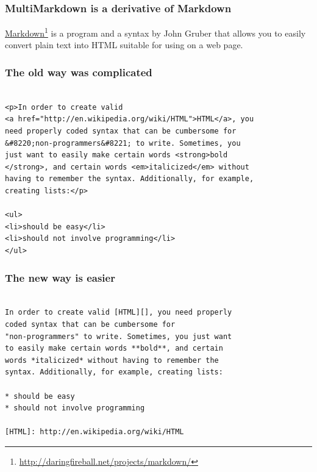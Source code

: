 
\def\mytitle{What is MultiMarkdown?  }
\def\subtitle{And why should you care? }
\def\myauthor{Fletcher T. Penney  }
\def\affiliation{http:\slash \slash fletcherpenney.net\slash multimarkdown\slash }
\def\copyright{2009 Fletcher T. Penney.  
This work is licensed under a Creative Commons License.  
http:\slash \slash creativecommons.org\slash licenses\slash by-sa\slash 2.5\slash 
}
\def\latexmode{beamer  }
\def\bibliostyle{fletcher}
\def\theme{keynote-gradient}

\begin{frame}

\frametitle{MultiMarkdown is a derivative of Markdown}
\label{multimarkdownisaderivativeofmarkdown}

\href{http://daringfireball.net/projects/markdown/}{Markdown}\footnote{\href{http://daringfireball.net/projects/markdown/}{http:\slash \slash daringfireball.net\slash projects\slash markdown\slash }} is a program and a
syntax by John Gruber that allows you to easily convert plain text into HTML
suitable for using on a web page.

\end{frame}

\begin{frame}[fragile]

\frametitle{The old way was complicated}
\label{theoldwaywascomplicated}

\begin{verbatim}

<p>In order to create valid 
<a href="http://en.wikipedia.org/wiki/HTML">HTML</a>, you 
need properly coded syntax that can be cumbersome for 
&#8220;non-programmers&#8221; to write. Sometimes, you
just want to easily make certain words <strong>bold
</strong>, and certain words <em>italicized</em> without
having to remember the syntax. Additionally, for example,
creating lists:</p>

<ul>
<li>should be easy</li>
<li>should not involve programming</li>
</ul>

\end{verbatim}


\end{frame}

\begin{frame}[fragile]

\frametitle{The new way is easier}
\label{thenewwayiseasier}

\begin{verbatim}

In order to create valid [HTML][], you need properly
coded syntax that can be cumbersome for 
"non-programmers" to write. Sometimes, you just want
to easily make certain words **bold**, and certain 
words *italicized* without having to remember the 
syntax. Additionally, for example, creating lists:

* should be easy
* should not involve programming

[HTML]: http://en.wikipedia.org/wiki/HTML

\end{verbatim}


\end{frame}

